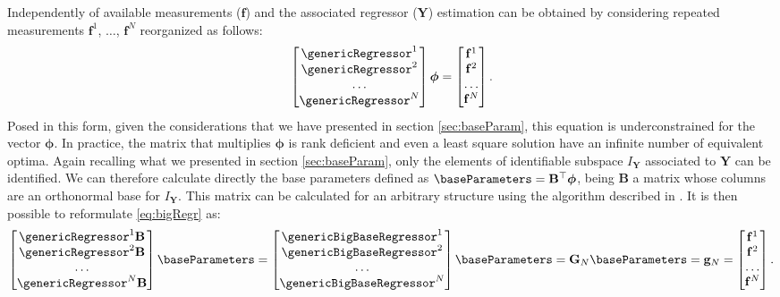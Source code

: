 Independently of available measurements ($\mathbf f$) and the associated regressor ($\mathbf {Y}$) estimation can be obtained by considering repeated measurements $\mathbf{f}^1$, $\dots$, $\mathbf{f}^N$ reorganized as follows:
\begin{equation}
\label{eq:bigRegr}
\begin{bmatrix} 
\genericRegressor^1 
\\
\genericRegressor^2
\\
\dots
\\
\genericRegressor^N
\\
\end{bmatrix}
\boldsymbol\phi
=
\begin{bmatrix}
\mathbf{f}^1
\\
\mathbf{f}^2
\\
\dots
\\
\mathbf{f}^N
\end{bmatrix}.
\end{equation}
Posed in this form, given the considerations that we have presented in section \ref{sec:baseParam}, this equation is underconstrained for the vector $\boldsymbol\phi$. In practice, the matrix that multiplies $\boldsymbol\phi$ is rank deficient and even a least square solution have an infinite number of equivalent optima. Again recalling what we presented in section \ref{sec:baseParam}, only the elements of identifiable 
subspace $I_{\mathbf {Y}}$ associated to $\mathbf {Y}$ can be identified. We can therefore calculate directly the base parameters defined as $\boldsymbol\baseParameters = \mathbf{B}^{\top} \boldsymbol\phi$, being $\mathbf{B}$ a matrix whose columns are an orthonormal base for $I_\mathbf{Y}$. This matrix can be calculated for an arbitrary structure using the algorithm described in \cite{gautierNumerical}. It is then possible to reformulate \ref{eq:bigRegr} as:
\begin{equation}
\label{eq:bigTildeRegr}
\begin{bmatrix} 
\genericRegressor^1 \mathbf{B}
\\
\genericRegressor^2 \mathbf{B}
\\
\dots
\\
\genericRegressor^N \mathbf{B}
\\
\end{bmatrix}
\baseParameters 
=
\begin{bmatrix} 
\genericBigBaseRegressor^1 
\\
\genericBigBaseRegressor^2 
\\
\dots
\\
\genericBigBaseRegressor^N 
\\
\end{bmatrix}
\baseParameters 
=
\mathbf{G}_N
\baseParameters 
=
\mathbf{g}_N
=
\begin{bmatrix}
\mathbf{f}^1
\\
\mathbf{f}^2
\\
\dots
\\
\mathbf{f}^N
\end{bmatrix}.
\end{equation}

